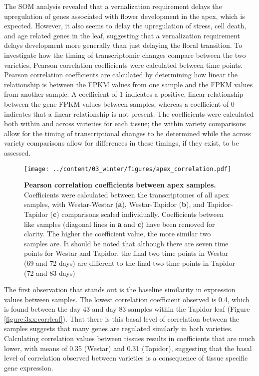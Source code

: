 \documentclass[12pt,]{book}
\begin{document}
The SOM analysis revealed that a vernalization requirement delays the
upregulation of genes associated with flower development in the apex,
which is expected. However, it also seems to delay the upregulation of
stress, cell death, and age related genes in the leaf, suggesting that a
vernalization requirement delays development more generally than just
delaying the floral transition. To investigate how the timing of
transcriptomic changes compare between the two varieties, Pearson
correlation coefficients were calculated between time points. Pearson
correlation coefficients are calculated by determining how linear the
relationship is between the FPKM values from one sample and the FPKM
values from another sample. A coefficient of 1 indicates a positive,
linear relationship between the gene FPKM values between samples,
whereas a coefficient of 0 indicates that a linear relationship is not
present. The coefficients were calculated both within and across
varieties for each tissue; the within variety comparisons allow for the
timing of transcriptional changes to be determined while the across
variety comparisons allow for differences in these timings, if they
exist, to be assessed.

\begin{figure}[htbp]
\centering
\texttt{[image: ../content/03\_winter/figures/apex\_correlation.pdf]}
\caption{\textbf{Pearson correlation coefficients between apex samples.}
Coefficients were calculated between the transcriptomes of all apex
samples, with Westar-Westar (\textbf{a}), Westar-Tapidor (\textbf{b}),
and Tapidor-Tapidor (\textbf{c}) comparisons scaled individually.
Coefficients between like samples (diagonal lines in \textbf{a} and
\textbf{c}) have been removed for clarity. The higher the coefficient
value, the more similar two samples are. It should be noted that
although there are seven time points for Westar and Tapidor, the final
two time points in Westar (69 and 72 days) are different to the final
two time points in Tapidor (72 and 83 days)}\label{figure:3xx:corrapex}
\end{figure}

The first observation that stands out is the baseline similarity in
expression values between samples. The lowest correlation coefficient
observed is 0.4, which is found between the day 43 and day 83 samples
within the Tapidor leaf (Figure \ref{figure:3xx:corrleaf}). That there
is this basal level of correlation between the samples suggests that
many genes are regulated similarly in both varieties. Calculating
correlation values between tissues results in coefficients that are much
lower, with means of 0.35 (Westar) and 0.31 (Tapidor), suggesting that
the basal level of correlation observed between varieties is a
consequence of tissue specific gene expression.
\end{document}
